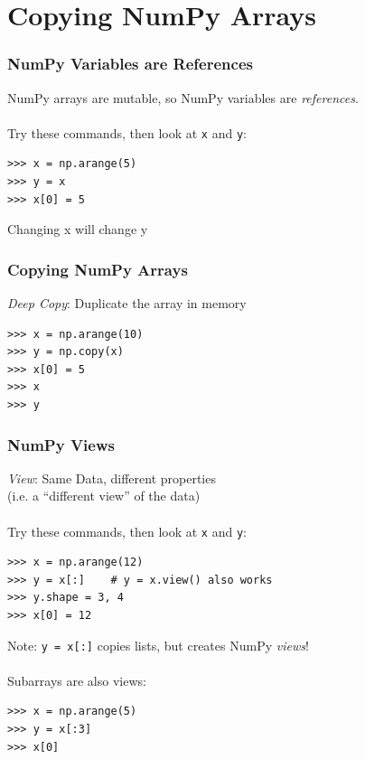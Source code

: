 \documentclass[red]{beamer}
\begin{document}
\section[Copying]{Copying NumPy Arrays}
\begin{frame}[fragile]
    \frametitle{NumPy Variables are References}

    NumPy arrays are mutable, so NumPy variables are \textit{references}.
    \\~\\
    Try these commands, then look at \lstinline|x| and \lstinline|y|:
    \begin{lstlisting}
>>> x = np.arange(5)
>>> y = x
>>> x[0] = 5
    \end{lstlisting}
    Changing x will change y
\end{frame}
\begin{frame}[fragile]
    \frametitle{Copying NumPy Arrays}

    \textit{Deep Copy}: Duplicate the array in memory
    \begin{lstlisting}
>>> x = np.arange(10)
>>> y = np.copy(x)
>>> x[0] = 5
>>> x
>>> y
    \end{lstlisting}
\end{frame}
\begin{frame}[fragile]
    \frametitle{NumPy Views}

    \textit{View}: Same Data, different properties\\
    (i.e. a ``different view'' of the data)
    \\~\\
    Try these commands, then look at \lstinline|x| and \lstinline|y|:
    \begin{lstlisting}
>>> x = np.arange(12)
>>> y = x[:]    # y = x.view() also works
>>> y.shape = 3, 4
>>> x[0] = 12
    \end{lstlisting}
    Note: \lstinline|y = x[:]| copies lists, but creates NumPy \textit{views}!
    \\~\\
    Subarrays are also views:
    \begin{lstlisting}
>>> x = np.arange(5)
>>> y = x[:3]
>>> x[0]
    \end{lstlisting}
\end{frame}
\end{document}
